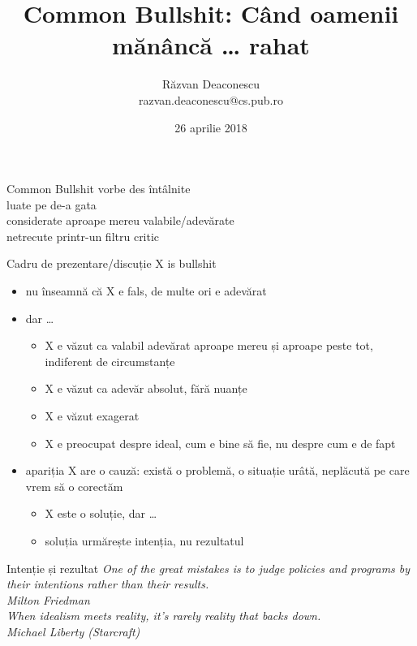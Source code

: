 \documentclass{simple}
\title[Common Bullshit]{Common Bullshit: Când oamenii mănâncă \ldots{} rahat}
\institute{}
\author[Răzvan Deaconescu]{Răzvan Deaconescu \\
razvan.deaconescu@cs.pub.ro}
\date{26 aprilie 2018}
\begin{document}
\frame{\titlepage}

\begin{frame}{Common Bullshit}
  \centering
  \Large
  \pause vorbe des întâlnite \\
  \pause luate pe de-a gata \\
  \pause considerate aproape mereu valabile/adevărate \\
  \pause netrecute printr-un filtru critic \\
\end{frame}

\begin{frame}{Cadru de prezentare/discuție}
  \pause X is bullshit
  \begin{itemize}
    \pause \item nu înseamnă că X e fals, de multe ori e adevărat
    \pause \item dar \ldots
      \begin{itemize}
        \pause \item X e văzut ca valabil adevărat aproape mereu și aproape peste tot, indiferent de circumstanțe
        \pause \item X e văzut ca adevăr absolut, fără nuanțe
        \pause \item X e văzut exagerat
        \pause \item X e preocupat despre ideal, cum e bine să fie, nu despre cum e de fapt
      \end{itemize}
    \pause \item apariția X are o cauză: există o problemă, o situație urâtă, neplăcută pe care vrem să o corectăm
      \begin{itemize}
        \pause \item X este o soluție, dar \ldots
        \pause \item soluția urmărește intenția, nu rezultatul
      \end{itemize}
  \end{itemize}
\end{frame}

\begin{frame}{Intenție și rezultat}
  \centering
  \pause \textit{One of the great mistakes is to judge policies and programs by their intentions rather than their results.}\\
  \vspace{3mm}
  \hfill \textit{Milton Friedman} \\
  \vspace{2cm}
  \centering
  \pause \textit{When idealism meets reality, it's rarely reality that backs down.} \\
  \vspace{3mm}
  \hfill \textit{Michael Liberty (Starcraft)}
\end{frame}
\end{document}
